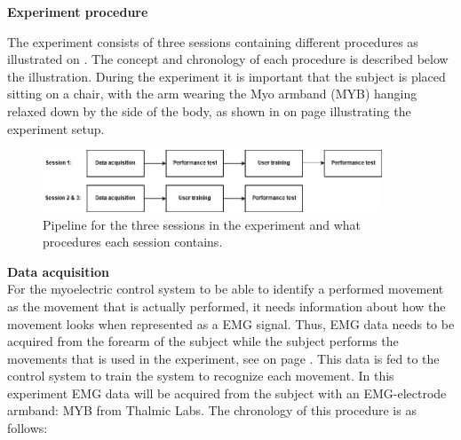 \textbf{\Large{Experiment procedure}}

The experiment consists of three sessions containing different procedures as illustrated on . The concept and chronology of each procedure is described below the illustration. During the experiment it is important that the subject is placed sitting on a chair, with the arm wearing the Myo armband (MYB) hanging relaxed down by the side of the body, as shown in  on page \pageref{fig:experiment_setup} illustrating the experiment setup. 

\begin{figure}[H]                                         
	\includegraphics[width=0.9\textwidth]{figures/pMethods/experiment_protocol_pipeline}  
	\caption{Pipeline for the three sessions in the experiment and what procedures each session contains.}
	\label{fig:experiment_protocol_pipeline} 
\end{figure}


\textbf{Data acquisition} \\
For the myoelectric control system to be able to identify a performed movement as the movement that is actually performed, it needs information about how the movement looks when represented as a EMG signal. Thus, EMG data needs to be acquired from the forearm of the subject while the subject performs the movements that is used in the experiment, see  on page \pageref{fig:experiment_movements}. This data is fed to the control system to train the system to recognize each movement. In this experiment EMG data will be acquired from the subject with an EMG-electrode armband: MYB from Thalmic Labs. The chronology of this procedure is as follows:

